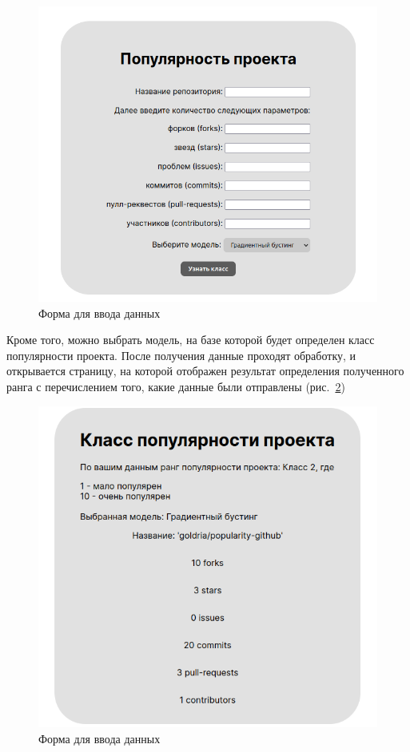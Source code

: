 \begin{center}
    \begin{figure}[H]
        \includegraphics[scale=0.5]{pic/form-data.png}
        \caption{Форма для ввода данных}
        \label{ris:form-data}
    \end{figure}
\end{center}
\vspace{1.5em}

Кроме того, можно выбрать модель, на базе которой будет определен класс популярности проекта. После получения данные проходят обработку, и открывается страницу, на которой отображен результат определения полученного ранга с перечислением того, какие данные были отправлены (рис.~\ref{ris:result-data})

\begin{center}
    \begin{figure}[H]
        \includegraphics[scale=0.5]{pic/result-data.png}
        \caption{Форма для ввода данных}
        \label{ris:result-data}
    \end{figure}
\end{center}
\vspace{1.5em}